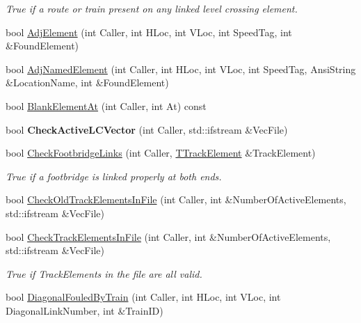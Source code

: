 \begin{DoxyCompactItemize}
\begin{DoxyCompactList}\small\item\em True if a route or train present on any linked level crossing element. \end{DoxyCompactList}\item 
bool \mbox{\hyperlink{class_t_track_a607c6164af3158c328dd7c3ae25236c7}{Adj\+Element}} (int Caller, int H\+Loc, int V\+Loc, int Speed\+Tag, int \&Found\+Element)
\item 
bool \mbox{\hyperlink{class_t_track_a96a3a6bcd38491f4f00ec2a585c6f170}{Adj\+Named\+Element}} (int Caller, int H\+Loc, int V\+Loc, int Speed\+Tag, Ansi\+String \&Location\+Name, int \&Found\+Element)
\item 
bool \mbox{\hyperlink{class_t_track_a928a29de1b2a916a1c829d40b68963e9}{Blank\+Element\+At}} (int Caller, int At) const
\item 
\mbox{\label{class_t_track_a3ff62ece81af00462951a989f3cee4e5}} 
bool {\bfseries Check\+Active\+L\+C\+Vector} (int Caller, std\+::ifstream \&Vec\+File)
\item 
\mbox{\label{class_t_track_a3c3dce0a9200d3c7dc27d26cdd40bb09}} 
bool \mbox{\hyperlink{class_t_track_a3c3dce0a9200d3c7dc27d26cdd40bb09}{Check\+Footbridge\+Links}} (int Caller, \mbox{\hyperlink{class_t_track_element}{T\+Track\+Element}} \&Track\+Element)
\begin{DoxyCompactList}\small\item\em True if a footbridge is linked properly at both ends. \end{DoxyCompactList}\item 
bool \mbox{\hyperlink{class_t_track_a07cde3507d67aff8eac4255ef28fde16}{Check\+Old\+Track\+Elements\+In\+File}} (int Caller, int \&Number\+Of\+Active\+Elements, std\+::ifstream \&Vec\+File)
\item 
\mbox{\label{class_t_track_a9ef606dc7da0eb00c5684c80a4891e04}} 
bool \mbox{\hyperlink{class_t_track_a9ef606dc7da0eb00c5684c80a4891e04}{Check\+Track\+Elements\+In\+File}} (int Caller, int \&Number\+Of\+Active\+Elements, std\+::ifstream \&Vec\+File)
\begin{DoxyCompactList}\small\item\em True if Track\+Elements in the file are all valid. \end{DoxyCompactList}\item 
bool \mbox{\hyperlink{class_t_track_a3b4a2e8a16c61a4286fcf34adb000819}{Diagonal\+Fouled\+By\+Train}} (int Caller, int H\+Loc, int V\+Loc, int Diagonal\+Link\+Number, int \&Train\+ID)

\end{DoxyCompactItemize}
